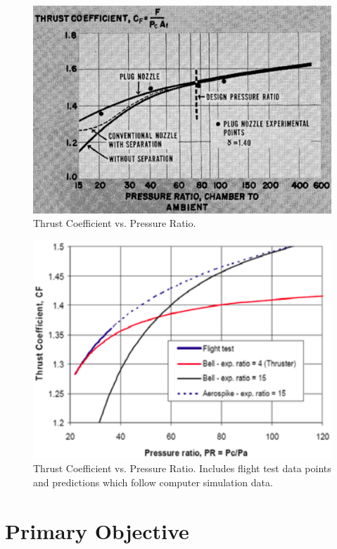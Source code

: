 \documentclass[conference]{IEEEtran} %
\begin{document}
	\begin{figure}
		\centering
		\includegraphics[width=\columnwidth]{figs/GraphOfASPerformance_Rao.png}
		\caption{Thrust Coefficient vs. Pressure Ratio.}
		\label{fig:2}
	\end{figure}
	
	\begin{figure}
		\centering
		\includegraphics[width=\columnwidth]{figs/CALVEIN's_AS_CFD_analysis.png}
		\caption{Thrust Coefficient vs. Pressure Ratio. Includes flight test data points and predictions which follow computer simulation data.}
		\label{fig:3}
	\end{figure}
	
	\section{Primary Objective}
	\label{sec:primary-obj}
	
\end{document}
